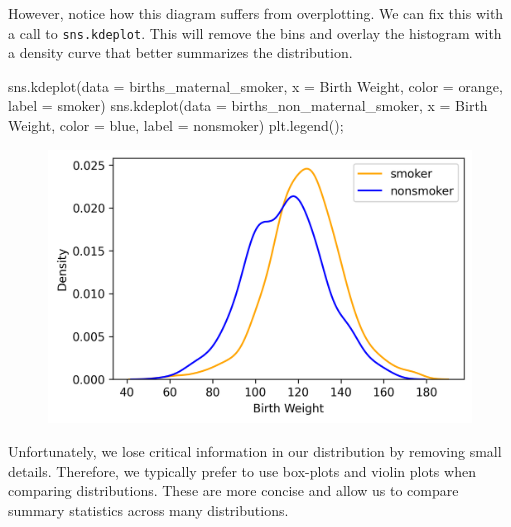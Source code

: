 \documentclass[
  letterpaper,
  DIV=11,
  numbers=noendperiod]{scrreprt}
\newenvironment{Shaded}{\begin{snugshade}}{\end{snugshade}}
\newcommand{\NormalTok}[1]{\textcolor[rgb]{0.00,0.23,0.31}{#1}}
\newcommand{\OperatorTok}[1]{\textcolor[rgb]{0.37,0.37,0.37}{#1}}
\newcommand{\StringTok}[1]{\textcolor[rgb]{0.13,0.47,0.30}{#1}}
\begin{document}
However, notice how this diagram suffers from overplotting. We can fix
this with a call to \texttt{sns.kdeplot}. This will remove the bins and
overlay the histogram with a density curve that better summarizes the
distribution.

\begin{Shaded}
\begin{Highlighting}[]
\NormalTok{sns.kdeplot(data }\OperatorTok{=}\NormalTok{ births\_maternal\_smoker, x }\OperatorTok{=} \StringTok{\textquotesingle{}Birth Weight\textquotesingle{}}\NormalTok{, color }\OperatorTok{=} \StringTok{\textquotesingle{}orange\textquotesingle{}}\NormalTok{, label }\OperatorTok{=} \StringTok{\textquotesingle{}smoker\textquotesingle{}}\NormalTok{)}
\NormalTok{sns.kdeplot(data }\OperatorTok{=}\NormalTok{ births\_non\_maternal\_smoker, x }\OperatorTok{=} \StringTok{\textquotesingle{}Birth Weight\textquotesingle{}}\NormalTok{, color }\OperatorTok{=} \StringTok{\textquotesingle{}blue\textquotesingle{}}\NormalTok{, label }\OperatorTok{=} \StringTok{\textquotesingle{}nonsmoker\textquotesingle{}}\NormalTok{)}
\NormalTok{plt.legend()}\OperatorTok{;}
\end{Highlighting}
\end{Shaded}

\begin{figure}[H]

{\centering \includegraphics{visualization_1/visualization_1_files/figure-pdf/cell-21-output-1.png}

}

\end{figure}

Unfortunately, we lose critical information in our distribution by
removing small details. Therefore, we typically prefer to use box-plots
and violin plots when comparing distributions. These are more concise
and allow us to compare summary statistics across many distributions.
\end{document}
